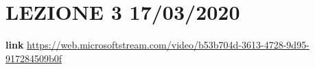 \section{LEZIONE 3 17/03/2020}
\textbf{link} \url{https://web.microsoftstream.com/video/b53b704d-3613-4728-9d95-917284509b0f}